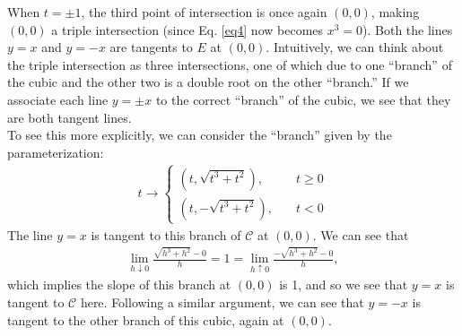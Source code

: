 \documentclass[12pt]{article}
\newcommand{\f}[2]{\frac{#1}{#2}}
\begin{document}
\noindent When $t = \pm 1$, the third point of intersection is once again $(0,0)$, making $(0,0)$ a triple intersection (since Eq. \eqref{eq4} now becomes $x^3 = 0$). Both the lines $y = x$ and $y = -x$ are tangents to $E$ at $(0,0)$. Intuitively, we can think about the triple intersection as three intersections, one of which due to one ``branch'' of the cubic and the other two is a double root on the other ``branch.'' If we associate each line $y = \pm x$ to the correct ``branch'' of the cubic, we see that they are both tangent lines. \\

\noindent To see this more explicitly, we can consider the ``branch'' given by the parameterization:
\begin{align*}
t \to \begin{cases}
(t, \sqrt{t^3+t^2}), &\quad t \geq 0\\
(t, -\sqrt{t^3+t^2}), &\quad t < 0
\end{cases}
\end{align*} 
The line $y = x$ is tangent to this branch of $\mathcal{C}$ at $(0,0)$. We can see that
\begin{align*}
\lim\limits_{h \downarrow 0} \f{\sqrt{h^3+h^2} - 0}{h} =  1 = \lim\limits_{h\uparrow 0}\f{-\sqrt{h^3+h^2} - 0}{h},
\end{align*}
which implies the slope of this branch at $(0,0)$ is 1, and so we see that $y=x$ is tangent to $\mathcal{C}$ here. Following a similar argument, we can see that $y = -x$ is tangent to the other branch of this cubic, again at $(0,0)$. 


\newpage
\end{document}
